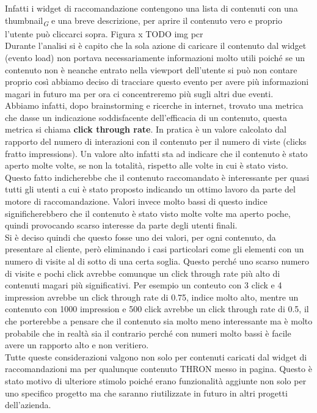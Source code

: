 \documentclass[a4paper, 12pt, twoside, openright]{book}
\newcommand{\gloss}[1]{#1\textsubscript{\textit{\tiny{G}}}}
\begin{document}
Infatti i widget di raccomandazione contengono una lista di contenuti con una \gloss{thumbnail} e una breve descrizione, per aprire il contenuto vero e proprio l'utente può cliccarci sopra. Figura x TODO img pcr\\
Durante l'analisi si è capito che la sola azione di caricare il contenuto dal widget (evento load) non portava necessariamente informazioni molto utili poiché se un contenuto non è neanche entrato nella viewport dell'utente si può non contare proprio così abbiamo deciso di tracciare questo evento per avere più informazioni magari in futuro ma per ora ci concentreremo più sugli altri due eventi.\\
Abbiamo infatti, dopo brainstorming e ricerche in internet, trovato una metrica che dasse un indicazione soddisfacente dell'efficacia di un contenuto, questa metrica si chiama \textbf{click through rate}. In pratica è un valore calcolato dal rapporto del numero di interazioni con il contenuto per il numero di viste (clicks fratto impressions). Un valore alto infatti sta ad indicare che il contenuto è stato aperto molte volte, se non la totalità, rispetto alle volte in cui è stato visto. Questo fatto indicherebbe che il contenuto raccomandato è interessante per quasi tutti gli utenti a cui è stato proposto indicando un ottimo lavoro da parte del motore di raccomandazione. Valori invece molto bassi di questo indice significherebbero che il contenuto è stato visto molte volte ma aperto poche, quindi provocando scarso interesse da parte degli utenti finali.\\
Si è deciso quindi che questo fosse uno dei valori, per ogni contenuto, da presentare al cliente, però eliminando i casi particolari come gli elementi con un numero di visite al di sotto di una certa soglia. Questo perché uno scarso numero di visite e pochi click avrebbe comunque un click through rate più alto di contenuti magari più significativi. Per esempio un conteuto con 3 click e 4 impression avrebbe un click through rate di 0.75, indice molto alto, mentre un contenuto con 1000 impression e 500 click avrebbe un click through rate di 0.5, il che porterebbe a pensare che il contenuto sia molto meno interessante ma è molto probabile che in realtà sia il contrario perché con numeri molto bassi è facile avere un rapporto alto e non veritiero.\\
Tutte queste considerazioni valgono non solo per contenuti caricati dal widget di raccomandazioni ma per qualunque contenuto THRON messo in pagina. Questo è stato motivo di ulteriore stimolo poiché erano funzionalità aggiunte non solo per uno specifico progetto ma che saranno riutilizzate in futuro in altri progetti dell'azienda.
\end{document}

